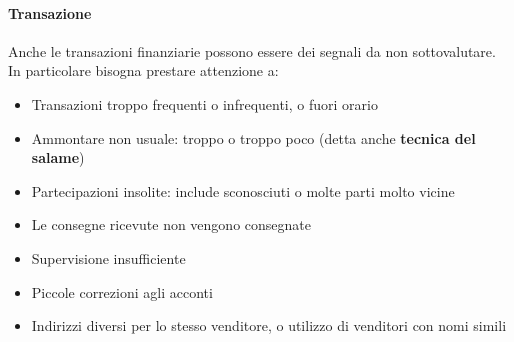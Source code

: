 \paragraph*{Transazione}Anche le transazioni finanziarie possono essere dei 
segnali da non sottovalutare. In particolare bisogna prestare attenzione a:
\begin{itemize}
  \item Transazioni troppo frequenti o infrequenti, o fuori orario
  \item Ammontare non usuale: troppo o troppo poco (detta anche
  \textbf{tecnica del salame})
  \item Partecipazioni insolite: include sconosciuti o molte parti molto vicine
  \item Le consegne ricevute non vengono consegnate
  \item Supervisione insufficiente
  \item Piccole correzioni agli acconti
  \item Indirizzi diversi per lo stesso venditore, o utilizzo di venditori con 
  nomi simili
\end{itemize}
